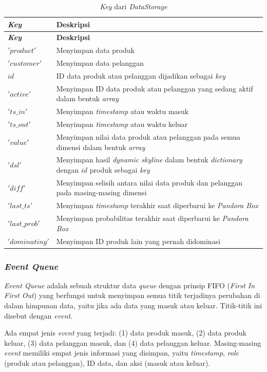 \begin{longtable}{| p{2.5cm} | p{6.5cm} |}
	\caption{\textit{Key} dari \textit{DataStorage} \label{tab:desc-key}}\\
	\hline
	\textbf{\textit{Key}} & \textbf{Deskripsi} \\ \hline 
	\endfirsthead
	\hline
	\textbf{\textit{Key}} & \textbf{Deskripsi} \\ \hline 
	\endhead
	$'product'$ & Menyimpan data produk \\ \hline
	$'customer'$ & Menyimpan data pelanggan \\ \hline
	$id$ & ID data produk atau pelanggan dijadikan sebagai \textit{key} \\ \hline
	$'active'$ & Menyimpan ID data produk atau pelanggan yang sedang aktif dalam bentuk \textit{array} \\ \hline
	$'ts\_in'$ & Menyimpan \textit{timestamp} atau waktu masuk \\ \hline
	$'ts\_out'$ & Menyimpan \textit{timestamp} atau waktu keluar \\ \hline
	$'value'$ & Menyimpan nilai data produk atau pelanggan pada semua dimensi dalam bentuk \textit{array}\\ \hline
	$'dsl'$ & Menyimpan hasil \textit{dynamic skyline} dalam bentuk \textit{dictionary} dengan $id$ produk sebagai \textit{key}\\ \hline
	$'diff'$ & Menyimpan selisih antara nilai data produk dan pelanggan pada masing-masing dimensi \\ \hline
	$'last\_ts'$ & Menyimpan \textit{timestamp} terakhir saat diperbarui ke \textit{Pandora Box}\\ \hline
	$'last\_prob'$ & Menyimpan probabilitas terakhir saat diperbarui ke \textit{Pandora Box}\\ \hline
	$'dominating'$ & Menyimpan ID produk lain yang pernah didominasi\\ \hline
\end{longtable}

\subsubsection{\textit{Event Queue}}
\tab \textit{Event Queue} adalah sebuah struktur data \textit{queue} dengan prinsip FIFO (\textit{First In First Out}) yang berfungsi untuk menyimpan semua titik terjadinya perubahan di dalam himpunan data, yaitu jika ada data yang masuk atau keluar. Titik-titik ini disebut dengan \textit{event}. 

\pagebreak
Ada empat jenis \textit{event} yang terjadi: (1) data produk masuk, (2) data produk keluar, (3) data pelanggan masuk, dan (4) data pelanggan keluar. Masing-masing \textit{event} memiliki empat jenis informasi yang disimpan, yaitu \textit{timestamp}, \textit{role} (produk atau pelanggan), ID data, dan aksi (masuk atau keluar).

